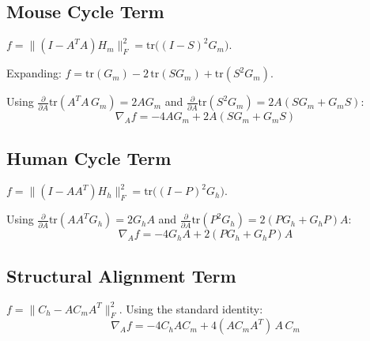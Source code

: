 \documentclass[10pt,twocolumn,letterpaper]{article}
\begin{document}
\subsection{Mouse Cycle Term}

$f = \|(I - A^T A) H_m\|_F^2 = \text{tr}\big((I - S)^2 G_m\big)$.

Expanding: $f = \text{tr}(G_m) - 2\,\text{tr}(SG_m) + \text{tr}(S^2 G_m)$.

Using $\frac{\partial}{\partial A}\text{tr}(A^T A\,G_m) = 2AG_m$ and
$\frac{\partial}{\partial A}\text{tr}(S^2 G_m) = 2A(SG_m + G_m S)$:
\begin{equation}
  \nabla_A f = -4AG_m + 2A(SG_m + G_m S)
\end{equation}

\subsection{Human Cycle Term}

$f = \|(I - AA^T) H_h\|_F^2 = \text{tr}\big((I - P)^2 G_h\big)$.

Using $\frac{\partial}{\partial A}\text{tr}(AA^T G_h) = 2G_h A$ and
$\frac{\partial}{\partial A}\text{tr}(P^2 G_h) = 2(PG_h + G_h P)A$:
\begin{equation}
  \nabla_A f = -4G_h A + 2(PG_h + G_h P)A
\end{equation}

\subsection{Structural Alignment Term}

$f = \|C_h - AC_m A^T\|_F^2$. Using the standard identity:
\begin{equation}
  \nabla_A f = -4C_h A C_m + 4(AC_m A^T)\,A\,C_m
\end{equation}


\end{document}
